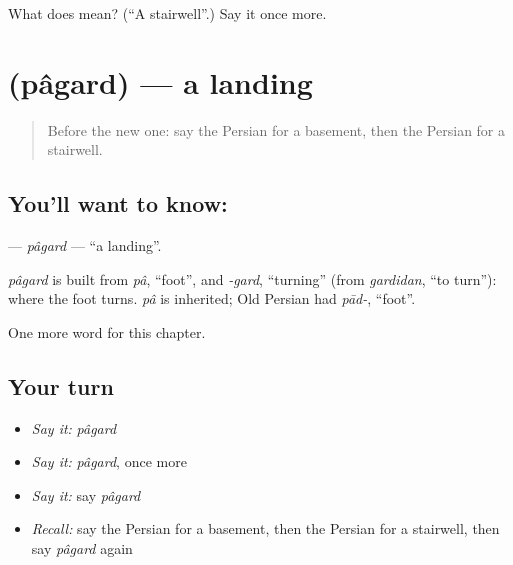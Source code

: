 \begin{tcolorbox}[breakable,colback=teal!4,colframe=teal!35!black,title={Before you move on}]
What does   mean? (\textquotedblleft{}A stairwell\textquotedblright{}.) Say it once more.
\end{tcolorbox}
\section[\texorpdfstring{\fa{پاگرد} (pâgard)}{پاگرد (pâgard)}]{ (pâgard) — a landing}

\label{lesson:FA-C232-pagard}



\begin{quote}
Before the new one: say the Persian for a basement, then the Persian for a stairwell.
\end{quote}

\subsection*{You'll want to know: }
\textbf{} — \emph{pâgard} — \textquotedblleft{}a landing\textquotedblright{}.

\begin{cousinweb}
\emph{pâgard} is built from \emph{pâ}, \textquotedblleft{}foot\textquotedblright{}, and \emph{-gard}, \textquotedblleft{}turning\textquotedblright{} (from \emph{gardidan}, \textquotedblleft{}to turn\textquotedblright{}): where the foot turns. \emph{pâ} is inherited; Old Persian had \emph{pād-}, \textquotedblleft{}foot\textquotedblright{}.
\end{cousinweb}

\begin{grammarlens}[title={What you've built}]
One more word for this chapter.
\end{grammarlens}

\subsection*{Your turn}
\begin{itemize}
\raggedright
  \item \emph{Say it:} \emph{pâgard}
  \item \emph{Say it:} \emph{pâgard}, once more
  \item \emph{Say it:} say \emph{pâgard}
  \item \emph{Recall:} say the Persian for a basement, then the Persian for a stairwell, then say \emph{pâgard} again
\end{itemize}

